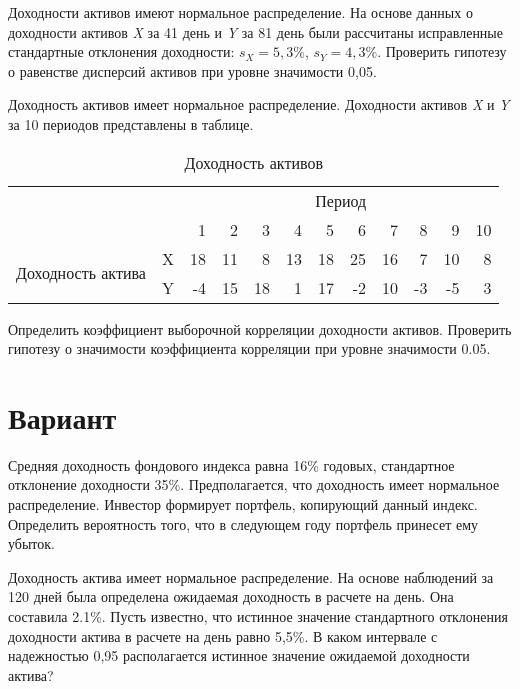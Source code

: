 \documentclass[12pt,a4paper]{article}
\begin{document}
\begin{taskrus}
Доходности активов имеют нормальное распределение. На основе данных о доходности активов \textit{X} за 41 день и \textit{Y} за 81 день были рассчитаны исправленные стандартные отклонения доходности: $s_X=5,3\%$, $s_Y = 4,3\%$. Проверить гипотезу о равенстве дисперсий активов при уровне значимости 0,05.
\end{taskrus}

\begin{taskrus} 
\label{task_sign_corrXY}
Доходность активов имеет нормальное распределение. Доходности активов \textit{X} и \textit{Y} за 10 периодов представлены в таблице.
\begin{table}[H]
  \centering
  \caption{Доходность активов}
    \begin{tabular}{rrrrrrrrrrrr}
    \toprule
    \multicolumn{2}{c}{\multirow{2}[1]{*}{}} & \multicolumn{10}{c}{Период} \\\cmidrule{3-12}
    \multicolumn{2}{c}{} & 1     & 2     & 3     & 4     & 5     & 6     & 7     & 8     & 9     & 10 \\
    \midrule
    \multicolumn{1}{l}{\multirow{2}[1]{*}{Доходность актива}} & X     & 18    & 11    & 8     & 13    & 18    & 25    & 16    & 7     & 10    & 8 \\
    \multicolumn{1}{l}{} & Y     & -4    & 15    & 18    & 1     & 17    & -2    & 10    & -3    & -5    & 3 \\
    \bottomrule
    \end{tabular}%
  \label{tab:addlabel}%
\end{table}%
Определить коэффициент выборочной корреляции доходности активов. Проверить гипотезу о значимости коэффициента корреляции при уровне значимости 0.05.
\end{taskrus}


\pagebreak
\section{Вариант}
\begin{taskrus}
Средняя доходность фондового индекса равна 16\% годовых, стандартное отклонение доходности 35\%. Предполагается, что доходность имеет нормальное распределение. Инвестор формирует портфель, копирующий данный индекс. Определить вероятность того, что в следующем году портфель принесет ему убыток.

\end{taskrus}
\begin{taskrus}
Доходность актива имеет нормальное распределение. На основе наблюдений за 120 дней была определена ожидаемая доходность в расчете на день. Она составила 2.1\%. Пусть известно, что истинное значение стандартного отклонения доходности актива в расчете на день равно 5,5\%. В каком интервале с надежностью 0,95 располагается истинное значение ожидаемой доходности актива?
\end{taskrus}
\end{document}
